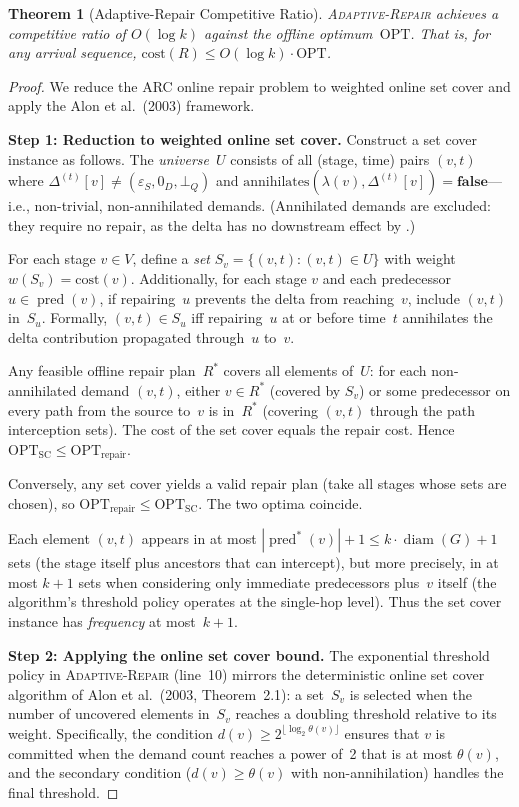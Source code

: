 \documentclass[11pt,a4paper]{article}
\newtheorem{theorem}{Theorem}[section]
\theoremstyle{definition}
\newcommand{\epsS}{\varepsilon_S}
\newcommand{\zeroD}{0_D}
\newcommand{\botQ}{\bot_Q}
\newcommand{\ann}{\mathrm{annihilates}}
\newcommand{\cost}{\mathrm{cost}}
\newcommand{\OPT}{\mathrm{OPT}}
\DeclareMathOperator{\pred}{pred}
\DeclareMathOperator{\diam}{diam}
\begin{document}
\begin{theorem}[Adaptive-Repair Competitive Ratio]\label{thm:adaptive-ratio}
\textsc{Adaptive-Repair} achieves a competitive ratio of $O(\log k)$ against
the offline optimum~$\OPT$.  That is, for any arrival sequence,
$\cost(R) \leq O(\log k) \cdot \OPT$.
\end{theorem}

\begin{proof}
We reduce the ARC online repair problem to weighted online set cover and
apply the Alon et al.\ (2003) framework.

\textbf{Step 1: Reduction to weighted online set cover.}
Construct a set cover instance as follows.  The \emph{universe}~$U$ consists
of all (stage, time) pairs $(v, t)$ where $\Delta^{(t)}[v] \neq
(\epsS, \zeroD, \botQ)$ and $\ann(\lambda(v), \Delta^{(t)}[v]) =
\mathbf{false}$---i.e., non-trivial, non-annihilated demands.  (Annihilated
demands are excluded: they require no repair, as the delta has no downstream
effect by .)

For each stage $v \in V$, define a \emph{set} $S_v = \{(v, t) : (v,t) \in U\}$
with weight $w(S_v) = \cost(v)$.  Additionally, for each stage $v$ and each
predecessor $u \in \pred(v)$, if repairing~$u$ prevents the delta from
reaching~$v$, include $(v, t)$ in~$S_u$.  Formally, $(v,t) \in S_u$ iff
repairing~$u$ at or before time~$t$ annihilates the delta contribution
propagated through~$u$ to~$v$.

Any feasible offline repair plan~$R^*$ covers all elements of~$U$: for each
non-annihilated demand $(v, t)$, either $v \in R^*$ (covered by $S_v$) or some
predecessor on every path from the source to~$v$ is in~$R^*$ (covering $(v,t)$
through the path interception sets).  The cost of the set cover equals the
repair cost.  Hence $\OPT_{\text{SC}} \leq \OPT_{\text{repair}}$.

Conversely, any set cover yields a valid repair plan (take all stages whose
sets are chosen), so $\OPT_{\text{repair}} \leq \OPT_{\text{SC}}$.  The
two optima coincide.

Each element $(v,t)$ appears in at most $|\pred^*(v)| + 1 \leq k \cdot
\diam(G) + 1$ sets (the stage itself plus ancestors that can intercept),
but more precisely, in at most $k + 1$ sets when considering only immediate
predecessors plus~$v$ itself (the algorithm's threshold policy operates at
the single-hop level).  Thus the set cover instance has \emph{frequency}
at most~$k + 1$.

\textbf{Step 2: Applying the online set cover bound.}
The exponential threshold policy in \textsc{Adaptive-Repair} (line~10)
mirrors the deterministic online set cover algorithm of Alon et al.\ (2003,
Theorem~2.1): a set~$S_v$ is selected when the number of uncovered elements
in~$S_v$ reaches a doubling threshold relative to its weight.  Specifically,
the condition $d(v) \geq 2^{\lfloor \log_2 \theta(v) \rfloor}$ ensures that
$v$ is committed when the demand count reaches a power of~2 that is at most
$\theta(v)$, and the secondary condition ($d(v) \geq \theta(v)$ with
non-annihilation) handles the final threshold.


\end{proof}
\end{document}
